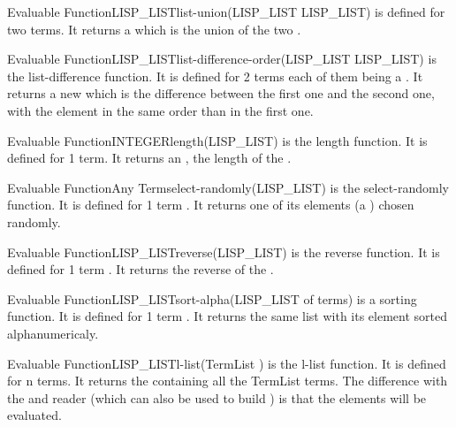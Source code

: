 \begin{typeefa}{Evaluable Function}{LISP\_LIST}{list-union}{(LISP\_LIST
LISP\_LIST)} is defined for two  terms. It returns a
 which is the union of the two .
\end{typeefa}

\begin{typeefa}{Evaluable Function}{LISP\_LIST}{list-difference-order}{(LISP\_LIST LISP\_LIST)}
is the list-difference function. It is defined for 2 terms each of them
being a . It returns a new  which is the difference
between the first one and the second one, with the element in the same
order than in the first one.
\end{typeefa}

\begin{typeefa}{Evaluable Function}{INTEGER}{length}{(LISP\_LIST)}
is the length function. It is defined for 1 term. It returns an ,
the length of the .
\end{typeefa}

\begin{typeefa}{Evaluable Function}{Any Term}{select-randomly}{(LISP\_LIST)}
is the select-randomly function. It is defined for 1 term . It
returns one of its elements (a ) chosen randomly.
\end{typeefa}

\begin{typeefa}{Evaluable Function}{LISP\_LIST}{reverse}{(LISP\_LIST)}
is the reverse function. It is defined for 1 term . It returns the
reverse of the .
\end{typeefa}

\begin{typeefa}{Evaluable Function}{LISP\_LIST}{sort-alpha}{(LISP\_LIST of terms)}
is a sorting function. It is defined for 1 term . It returns the
same list with its element sorted alphanumericaly.
\end{typeefa}

\begin{typeefa}{Evaluable Function}{LISP\_LIST}{l-list}{(TermList )}
is the l-list function. It is defined for n terms. It returns the
 containing all the TermList terms. The difference with the
 and  reader (which can also be used to build )
is that the elements will be evaluated.
\end{typeefa}

